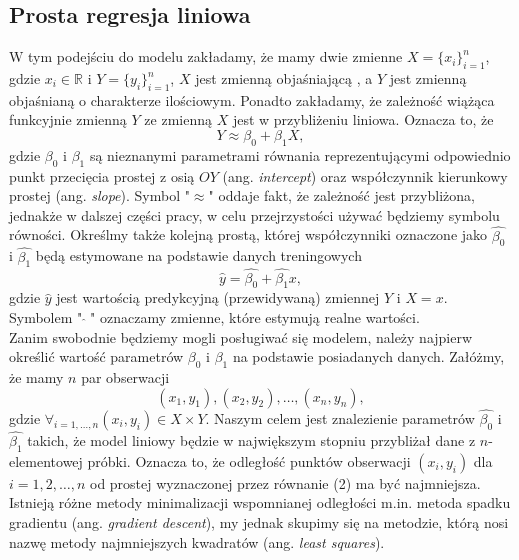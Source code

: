 \documentclass[a4paper]{article}
\begin{document}
\subsection{Prosta regresja liniowa}
W tym podejściu do modelu zakładamy, że mamy dwie zmienne $X= \{x_i\}_{i=1}^n$, gdzie $x_i \in \mathbb{R}$ i $Y = \{y_i\}_{i=1}^n$, $X$ jest zmienną objaśniającą , a $Y$ jest zmienną objaśnianą o charakterze ilościowym. Ponadto zakładamy, że zależność wiążąca funkcyjnie zmienną $Y$ ze zmienną $X$ jest w przybliżeniu liniowa. Oznacza to, że 
\begin{equation}\label{(3.1)}
    Y \approx \beta_0 + \beta_1X,
\end{equation}
gdzie $\beta_0$ i $\beta_1$ są nieznanymi parametrami równania reprezentującymi odpowiednio punkt przecięcia prostej z osią $OY$ (ang. \textit{intercept}) oraz współczynnik kierunkowy prostej (ang. \textit{slope}). Symbol "$\approx$" oddaje fakt, że zależność jest przybliżona, jednakże w dalszej części pracy, w celu przejrzystości używać będziemy symbolu równości. Określmy także kolejną prostą, której współczynniki oznaczone jako $\hat{\beta_0}$ i $\hat{\beta_1}$ będą estymowane na podstawie danych treningowych 
\begin{equation}\label{(2.2)}
    \hat{y} = \hat{\beta_0} + \hat{\beta_1}x,
\end{equation}
gdzie $\hat{y}$ jest wartością predykcyjną (przewidywaną) zmiennej $Y$  i $X = x$. Symbolem "$\;\hat{}\;$" oznaczamy zmienne, które estymują realne wartości.
\\\indent Zanim swobodnie będziemy mogli posługiwać się modelem, należy najpierw określić wartość parametrów $\beta_0$ i $\beta_1$ na podstawie posiadanych danych. Załóżmy, że mamy $n$ par obserwacji
\begin{equation}
(x_1, y_1), (x_2, y_2),\dots, (x_n, y_n),    
\end{equation}
gdzie $\forall_{i=1,\dots,n}(x_i, y_i)\in X\times Y$. Naszym celem jest znalezienie parametrów $\hat{\beta_0}$ i $\hat{\beta_1}$ takich, że model liniowy będzie w największym stopniu przybliżał dane z $n$-elementowej próbki. Oznacza to, że odległość punktów obserwacji $(x_i, y_i)$ dla $i = 1,2,\dots,n$ od prostej wyznaczonej przez równanie {(2)}
 ma być najmniejsza. Istnieją różne metody minimalizacji wspomnianej odległości m.in. metoda spadku gradientu (ang. \textit{gradient descent}), my jednak skupimy się na  metodzie, którą nosi nazwę metody najmniejszych kwadratów (ang. \textit{least squares}).
\end{document}
